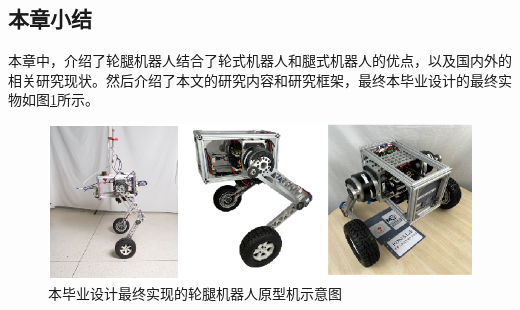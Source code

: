 \subsection{本章小结}
本章中，介绍了轮腿机器人结合了轮式机器人和腿式机器人的优点，以及国内外的相关研究现状。然后介绍了本文的研究内容和研究框架，最终本毕业设计的最终实物如图\ref{fig:sec1-result}所示。

\begin{figure}[t]
  \centering
  \includegraphics[width=1.0\linewidth]{figures/Sec1/result.png}
  \caption{
  本毕业设计最终实现的轮腿机器人原型机示意图
  }
  \label{fig:sec1-result}
   \vspace{4pt}
\end{figure}